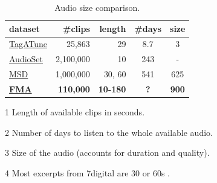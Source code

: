 \documentclass{article}
\begin{document}
\begin{table}
	\centering
	\begin{threeparttable}
	\begin{tabular}{lrrcc}
		\toprule
		dataset & \#clips & length\tnote{1} & \#days\tnote{2} & size\tnote{3} \\
		\midrule
		\href{http://mirg.city.ac.uk/codeapps/the-magnatagatune-dataset}{TagATune} \cite{magnatagatune} & 25,863 & 29 & 8.7 & 3 \\ %
		\href{https://research.google.com/audioset/}{AudioSet} \cite{audioset} & 2,100,000 & 10 & 243 & - \\
		\href{https://labrosa.ee.columbia.edu/millionsong/}{MSD} \cite{msd} & 1,000,000 & 30, 60\tnote{4} & 541 & 625 \\
		\bf \href{https://github.com/mdeff/fma/}{FMA} & \bf 110,000 & \bf 10-180 & \bf ? & \bf 900 \\
		\bottomrule
	\end{tabular}
	\begin{tablenotes}
		\item[1] Length of available clips in seconds.
		\item[2] Number of days to listen to the whole available audio.
		\item[3] Size of the audio (accounts for duration and quality).
		\item[4] Most excerpts from 7digital are 30 or 60s \cite{msd_features}.
	\end{tablenotes}
	\end{threeparttable}
	\caption{Audio size comparison.}
	\label{tab:size}
\end{table}

\end{document}
